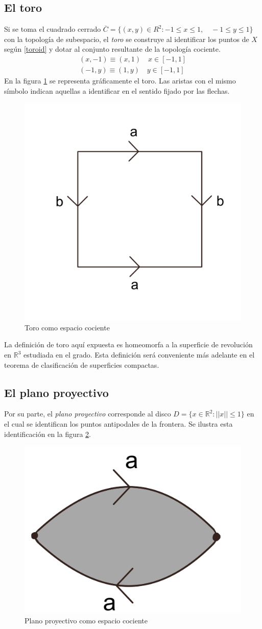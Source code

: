 \documentclass[a4paper,11pt,spanish, twoside, leqno]{tfg-uam}
\newcommand*{\reales}{\mathbb{R}}
\theoremstyle{definition}
\begin{document}
\subsection*{El toro}
Si se toma el cuadrado cerrado $ \overline{C} = \{ (x,y) \in R^2: -1\leq x\leq 1,\quad -1\leq y \leq 1  \} $ con la topología de subespacio, el \textit{toro}  se construye al identificar los puntos de  $ X $ según  \ref{toroid} y dotar al conjunto resultante de la topología cociente.
\begin{align}\label{toroid}
	(x,-1)\equiv(x,1) \quad x\in [-1,1]  \\
	(-1,y)\equiv(1,y) \quad y\in [-1,1] \nonumber
\end{align}
En la figura \ref{fig:toro expresion canonica} se representa gráficamente el toro. Las aristas con el mismo símbolo indican aquellas a identificar en el sentido fijado por las flechas.
\begin{figure}[h!]
	\centering
	\includegraphics[width=0.2\linewidth]{imagenes/toroplano.png}
	\caption{Toro como espacio cociente}
	\label{fig:toro expresion canonica}
\end{figure} 

La definición de toro aquí expuesta es homeomorfa a la superficie de revolución en $\reales^3$ estudiada en el grado. Esta definición será conveniente más adelante en el teorema de clasificación de superficies compactas.

\subsection*{El plano proyectivo}
Por su parte, el \textit{plano proyectivo} corresponde al disco $ D = \{x\in\mathbb{R}^2: ||x||\leq1 \} $ en el cual se identifican los puntos antipodales de la frontera. Se ilustra esta identificación en la figura \ref{fig:planoproyectivo expresión canónica}.

\begin{figure}[h!]
	\centering
	\includegraphics[width=0.3\linewidth]{imagenes/planop_plano.png}
	\caption{Plano proyectivo como espacio cociente}
	\label{fig:planoproyectivo expresión canónica}
\end{figure} 
\end{document}
